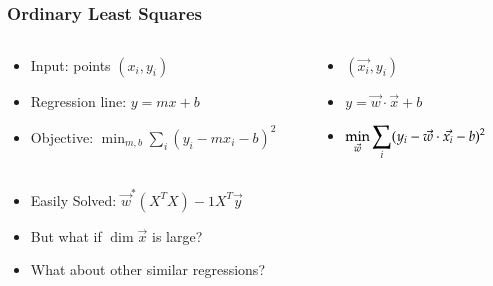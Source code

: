 \subsection{}
\begin{frame}
\frametitle{Ordinary Least Squares}

\begin{columns}
  \begin{column}{0.6\textwidth}
    \begin{itemize}
    \item[] Input: points $(x_i, y_i)$
      \item[] Regression line: $y = mx + b$
\item[] Objective: $\displaystyle \min_{m, b} \sum_{i}(y_i - mx_i -b)^2$
    \end{itemize}
  \end{column}

  \begin{column}{0.5\textwidth}
    \begin{itemize}
    \item[] $(\vec{x_i}, y_i)$
    \item[] $y = \vec{w} \cdot \vec{x} + b$
    \item[] $\displaystyle \min_{\vec{w}}\sum_{i}(y_i - \vec{w} \cdot \vec{x_i} -b)^2$
    \end{itemize}

  \end{column}
\end{columns}

\begin{itemize}
\item Easily Solved: $\vec{w}^*(X^TX)-1X^T\vec{y}$
\item But what if $\dim\vec{x} $ is large?
\item What about other similar regressions?
\end{itemize}

\end{frame}

